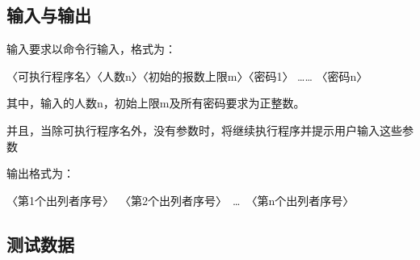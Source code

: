 \documentclass[UTF8]{article}
\begin{document}
	\subsection{输入与输出}
	输入要求以命令行输入，格式为：
	\begin{center}
		〈可执行程序名〉〈人数n〉〈初始的报数上限m〉〈密码1〉 …… 〈密码n〉
	\end{center}\par
	其中，输入的人数n，初始上限m及所有密码要求为正整数。\par
	并且，当除可执行程序名外，没有参数时，将继续执行程序并提示用户输入这些参数\par
	输出格式为：\par
	\begin{center}
		〈第1个出列者序号〉\ 〈第2个出列者序号〉\  \dots\ 〈第n个出列者序号〉
	\end{center}\par

	\subsection{测试数据}
\end{document}
